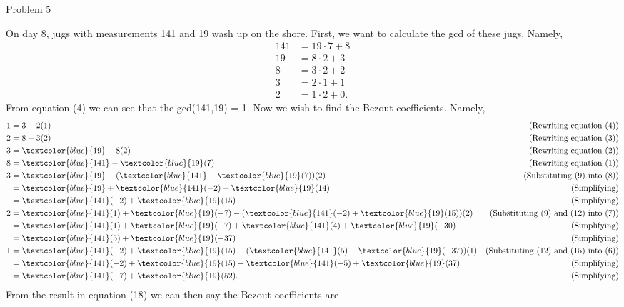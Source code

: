 \begin{problem}{Problem 5}
    \begin{Highlight}[Solution]
        On day 8, jugs with measurements 141 and 19 wash up on the shore. First, we want to calculate the gcd of these jugs. Namely,
        \setcounter{equation}{0}
        \begin{align}
            141 & = 19 \cdot 7 + 8 \\
            19 & = 8 \cdot 2 + 3 \\
            8 & = 3 \cdot 2 + 2 \\
            3 & = 2 \cdot 1 + 1 \\
            2 & = 1 \cdot 2 + 0.
        \end{align}
        From equation (4) we can see that the gcd(141,19) = 1. Now we wish to find the Bezout coefficients. Namely,
        {\small
            \begin{align}
                1 & = 3 - 2(1) & \text{(Rewriting equation (4))} \\
                2 & = 8 - 3(2) & \text{(Rewriting equation (3))} \\
                3 & = \textcolor{blue}{19} - 8(2) & \text{(Rewriting equation (2))} \\
                8 & = \textcolor{blue}{141} - \textcolor{blue}{19}(7) & \text{(Rewriting equation (1))} \\
                3 & = \textcolor{blue}{19} - (\textcolor{blue}{141} - \textcolor{blue}{19}(7))(2) & \text{(Substituting (9) into (8))} \\
                & = \textcolor{blue}{19} + \textcolor{blue}{141}(-2) + \textcolor{blue}{19}(14) & \text{(Simplifying)} \\
                & = \textcolor{blue}{141}(-2) + \textcolor{blue}{19}(15) & \text{(Simplifying)} \\
                2 & = \textcolor{blue}{141}(1) + \textcolor{blue}{19}(-7) - (\textcolor{blue}{141}(-2) + \textcolor{blue}{19}(15))(2) & \text{(Substituting (9) and (12) into (7))} \\
                & = \textcolor{blue}{141}(1) + \textcolor{blue}{19}(-7) + \textcolor{blue}{141}(4) + \textcolor{blue}{19}(-30) & \text{(Simplifying)} \\
                & = \textcolor{blue}{141}(5) + \textcolor{blue}{19}(-37) & \text{(Simplifying)} \\
                1 & = \textcolor{blue}{141}(-2) + \textcolor{blue}{19}(15) - (\textcolor{blue}{141}(5) + \textcolor{blue}{19}(-37))(1) & \text{(Substituting (12) and (15) into (6))} \\
                & = \textcolor{blue}{141}(-2) + \textcolor{blue}{19}(15) + \textcolor{blue}{141}(-5) + \textcolor{blue}{19}(37) & \text{(Simplifying)} \\
                & = \textcolor{blue}{141}(-7) + \textcolor{blue}{19}(52). & \text{(Simplifying)}
            \end{align}
        }
        From the result in equation (18) we can then say the Bezout coefficients are


\end{Highlight}
\end{problem}
